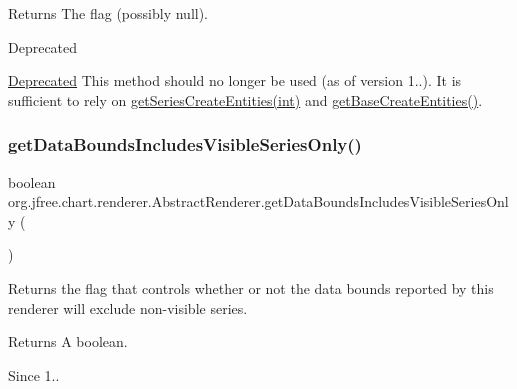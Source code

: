 \begin{DoxyReturn}{Returns}
The flag (possibly {\ttfamily null}).
\end{DoxyReturn}
\begin{DoxyRefDesc}{Deprecated}
\item[\mbox{\hyperlink{deprecated__deprecated000143}{Deprecated}}]This method should no longer be used (as of version 1..). It is sufficient to rely on \mbox{\hyperlink{classorg_1_1jfree_1_1chart_1_1renderer_1_1_abstract_renderer_ab00f0025b38b9114f5fb3fded82628e7}{get\+Series\+Create\+Entities(int)}} and \mbox{\hyperlink{classorg_1_1jfree_1_1chart_1_1renderer_1_1_abstract_renderer_a44d0d70c2ce52e48ba1ccafade04693b}{get\+Base\+Create\+Entities()}}. \end{DoxyRefDesc}
\mbox{\label{classorg_1_1jfree_1_1chart_1_1renderer_1_1_abstract_renderer_ab6669cf6da6a5d6cd375908c296e6983}} 
\subsubsection{\texorpdfstring{get\+Data\+Bounds\+Includes\+Visible\+Series\+Only()}{getDataBoundsIncludesVisibleSeriesOnly()}}
{\footnotesize\ttfamily boolean org.\+jfree.\+chart.\+renderer.\+Abstract\+Renderer.\+get\+Data\+Bounds\+Includes\+Visible\+Series\+Only (\begin{DoxyParamCaption}{ }\end{DoxyParamCaption})}

Returns the flag that controls whether or not the data bounds reported by this renderer will exclude non-\/visible series.

\begin{DoxyReturn}{Returns}
A boolean.
\end{DoxyReturn}
\begin{DoxySince}{Since}
1.. 
\end{DoxySince}
\mbox{\label{classorg_1_1jfree_1_1chart_1_1renderer_1_1_abstract_renderer_aa9bc3e1d149543667cfbd109b19d7477}} 
